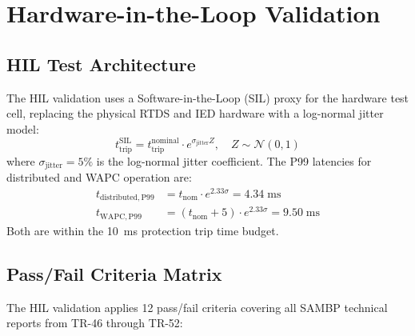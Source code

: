 \section{Hardware-in-the-Loop Validation}
\label{sec:ch11_hil}

\subsection{HIL Test Architecture}

The HIL validation uses a Software-in-the-Loop (SIL) proxy for the
hardware test cell, replacing the physical RTDS and IED hardware with
a log-normal jitter model:
\begin{equation}
  t_\mathrm{trip}^\mathrm{SIL} = t_\mathrm{trip}^\mathrm{nominal}
    \cdot e^{\sigma_\mathrm{jitter} Z}, \quad Z \sim \mathcal{N}(0, 1)
  \label{eq:ch9_sil_jitter}
\end{equation}
where $\sigma_\mathrm{jitter} = 5\%$ is the log-normal jitter coefficient.
The P99 latencies for distributed and WAPC operation are:
\begin{align}
  t_\mathrm{distributed,P99} &= t_\mathrm{nom} \cdot e^{2.33 \sigma} = 4.34\;\mathrm{ms}
  \label{eq:ch9_distributed_p99} \\
  t_\mathrm{WAPC,P99} &= (t_\mathrm{nom} + 5) \cdot e^{2.33 \sigma} = 9.50\;\mathrm{ms}
  \label{eq:ch9_wapc_p99}
\end{align}
Both are within the 10~ms protection trip time budget.

\subsection{Pass/Fail Criteria Matrix}

The HIL validation applies 12 pass/fail criteria covering all SAMBP
technical reports from TR-46 through TR-52:

